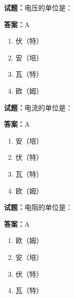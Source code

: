 \documentclass{ctexbook}
\begin{document}




\vspace{1em}

\textbf{试题：}电压的单位是： 

\textbf{答案：}A 

\begin{enumerate}[leftmargin=3em]
  \item 伏（特） 

  \item 安（培） 

  \item 瓦（特） 

  \item 欧（姆） 

\end{enumerate}





\vspace{1em}

\textbf{试题：}电流的单位是： 

\textbf{答案：}A 

\begin{enumerate}[leftmargin=3em]
  \item 安（培） 

  \item 伏（特） 

  \item 瓦（特） 

  \item 欧（姆） 

\end{enumerate}





\vspace{1em}

\textbf{试题：}电阻的单位是： 

\textbf{答案：}A 

\begin{enumerate}[leftmargin=3em]
  \item 欧（姆） 

  \item 安（培） 

  \item 伏（特） 

  \item 瓦（特） 

\end{enumerate}
\end{document}
